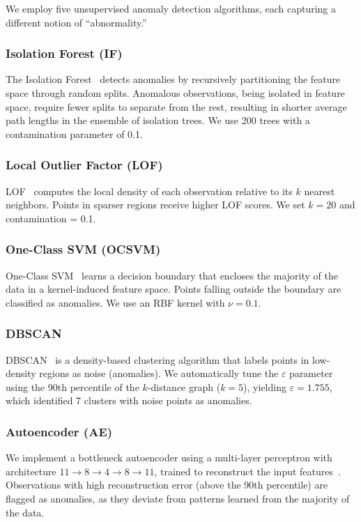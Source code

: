 \documentclass{ieeeaccess}
\begin{document}
We employ five unsupervised anomaly detection algorithms, each capturing a different notion of ``abnormality.''

\subsubsection{Isolation Forest (IF)}
The Isolation Forest~\cite{liu2008isolation, liu2012isolation} detects anomalies by recursively partitioning the feature space through random splits. Anomalous observations, being isolated in feature space, require fewer splits to separate from the rest, resulting in shorter average path lengths in the ensemble of isolation trees. We use 200 trees with a contamination parameter of 0.1.

\subsubsection{Local Outlier Factor (LOF)}
LOF~\cite{breunig2000lof} computes the local density of each observation relative to its $k$ nearest neighbors. Points in sparser regions receive higher LOF scores. We set $k = 20$ and contamination = 0.1.

\subsubsection{One-Class SVM (OCSVM)}
One-Class SVM~\cite{scholkopf2001estimating} learns a decision boundary that encloses the majority of the data in a kernel-induced feature space. Points falling outside the boundary are classified as anomalies. We use an RBF kernel with $\nu = 0.1$.

\subsubsection{DBSCAN}
DBSCAN~\cite{ester1996density} is a density-based clustering algorithm that labels points in low-density regions as noise (anomalies). We automatically tune the $\varepsilon$ parameter using the 90th percentile of the $k$-distance graph ($k = 5$), yielding $\varepsilon = 1.755$, which identified 7 clusters with noise points as anomalies.

\subsubsection{Autoencoder (AE)}
We implement a bottleneck autoencoder using a multi-layer perceptron with architecture $11 \rightarrow 8 \rightarrow 4 \rightarrow 8 \rightarrow 11$, trained to reconstruct the input features~\cite{hinton2006reducing}. Observations with high reconstruction error (above the 90th percentile) are flagged as anomalies, as they deviate from patterns learned from the majority of the data.
\end{document}
